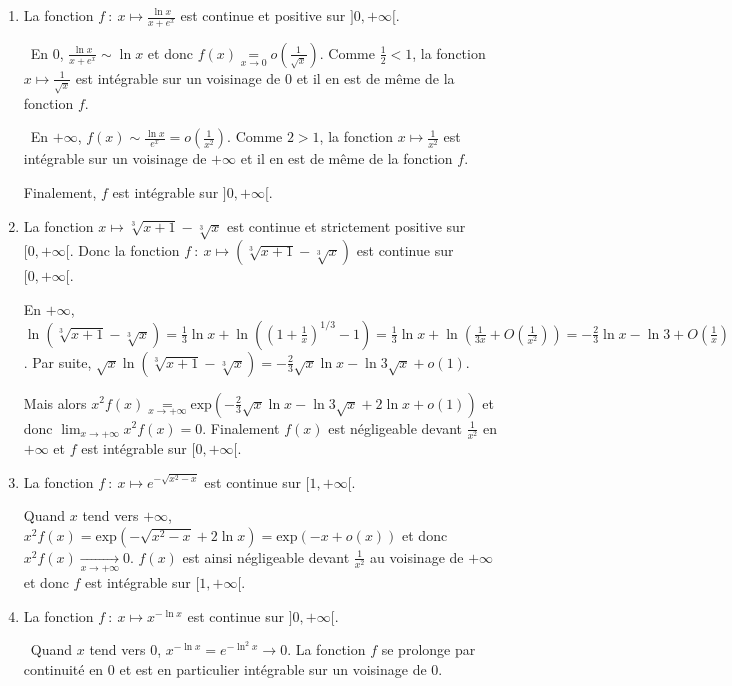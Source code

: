 {{\begin{enumerate}
\item  La fonction $f~:~x\mapsto\frac{\ln x}{x+e^x}$ est continue et positive sur $]0,+\infty[$.

\textbullet~En $0$, $\frac{\ln x}{x+e^x}\sim\ln x$ et donc $f(x)\underset{x\rightarrow0}{=}o\left(\frac{1}{\sqrt{x}}\right)$. Comme $\frac{1}{2}<1$, la fonction $x\mapsto\frac{1}{\sqrt{x}}$ est intégrable sur un voisinage de $0$ et il en est de même de la fonction $f$.

\textbullet~En $+\infty$,  $f(x)\sim\frac{\ln x}{e^x}=o\left(\frac{1}{x^2}\right)$. Comme $2>1$, la fonction $x\mapsto\frac{1}{x^2}$ est intégrable sur un voisinage de $+\infty$ et il en est de même de la fonction $f$. 

Finalement, $f$ est intégrable sur $]0,+\infty[$.

\item  La fonction $x\mapsto\sqrt[3]{x+1}-\sqrt[3]{x}$ est continue et strictement positive sur $[0,+\infty[$. Donc la fonction $f~:~x\mapsto\left(\sqrt[3]{x+1}-\sqrt[3]{x}\right)$ est continue sur $[0,+\infty[$.

En $+\infty$, $\ln\left(\sqrt[3]{x+1}-\sqrt[3]{x}\right)=\frac{1}{3}\ln x+\ln\left(\left(1+\frac{1}{x}\right)^{1/3}-1\right)=\frac{1}{3}\ln x+\ln\left(\frac{1}{3x}+O\left(\frac{1}{x^2}\right)\right)= -\frac{2}{3}\ln x -\ln3 + O\left(\frac{1}{x}\right)$. Par suite, $\sqrt{x}\ln\left(\sqrt[3]{x+1}-\sqrt[3]{x}\right)=-\frac{2}{3}\sqrt{x}\ln x -\ln3\sqrt{x}+o(1)$.

Mais alors $x^2f(x)\underset{x\rightarrow+\infty}{=}\text{exp}\left(-\frac{2}{3}\sqrt{x}\ln x -\ln3\sqrt{x}+2\ln x+o(1)\right)$ et donc $\lim_{x \rightarrow +\infty}x^2f(x)=0$. Finalement $f(x)$ est négligeable devant $\frac{1}{x^2}$ en $+\infty$ et $f$ est intégrable sur $[0,+\infty[$.

\item  La fonction $f~:~x\mapsto e^{-\sqrt{x^2-x}}$ est continue sur $[1,+\infty[$.

Quand $x$ tend vers $+\infty$, $x^2f(x)=\text{exp}\left(-\sqrt{x^2-x}+2\ln x\right)=\text{exp}(-x+o(x))$ et donc $x^2f(x)\underset{x\rightarrow+\infty}{\rightarrow}0$. $f(x)$ est ainsi négligeable devant $\frac{1}{x^2}$ au voisinage de $+\infty$ et donc $f$ est intégrable sur $[1,+\infty[$.

\item  La fonction $f~:~x\mapsto x^{-\ln x}$ est continue sur $]0,+\infty[$.

\textbullet~Quand $x$ tend vers $0$, $x^{-\ln x}=e^{-\ln^2x}\rightarrow0$. La fonction $f$ se prolonge par continuité en $0$ et est en particulier intégrable sur un voisinage de $0$.


\end{enumerate}}}
